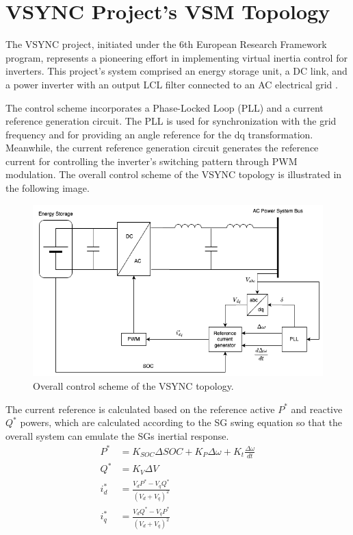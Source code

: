 \section{VSYNC Project's VSM Topology}\label{sec:VSYNC}

The VSYNC project, initiated under the 6th European Research Framework program,
represents a pioneering effort in implementing virtual inertia control for
inverters. This project's system comprised an energy storage unit, a DC link,
and a power inverter with an output LCL filter connected to an AC electrical
grid \cite{visscher2008vsg}.

The control scheme incorporates a Phase-Locked Loop (PLL) and a current
reference generation circuit. The PLL is used for synchronization with the grid
frequency and for providing an angle reference for the dq transformation.
Meanwhile, the current reference generation circuit generates the reference
current for controlling the inverter's switching pattern through PWM modulation.
The overall control scheme of the VSYNC topology is illustrated in the following
image.

\begin{figure}
    \centering
    \includegraphics[width=12cm]{images/VSYNC.png}
    \caption{Overall control scheme of the VSYNC topology.}
    \label{fig:VSYNC}
\end{figure}

The current reference is calculated based on the reference active $P^*$ and
reactive $Q^*$ powers, which are calculated according to the SG swing equation
so that the overall system can emulate the SGs inertial response.
\begin{equation*}
    \begin{aligned}
        P^* &= K_{SOC}\Delta SOC + K_P \Delta\omega + K_t \frac{\Delta \omega}{dt}\\
        Q^* &= K_V \Delta V\\
        i_{d}^* &= \frac{V_d P^* - V_q Q^*}{(V_d + V_q)^2}\\
        i_{q}^* &= \frac{V_d Q^* - V_q P^*}{(V_d + V_q)^2}
    \end{aligned}
\end{equation*}

